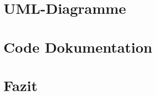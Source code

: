 \documentclass[a4paper]{article}
\begin{document}
\section{UML-Diagramme}

\section{Code Dokumentation}

\section{Fazit}
\end{document}

